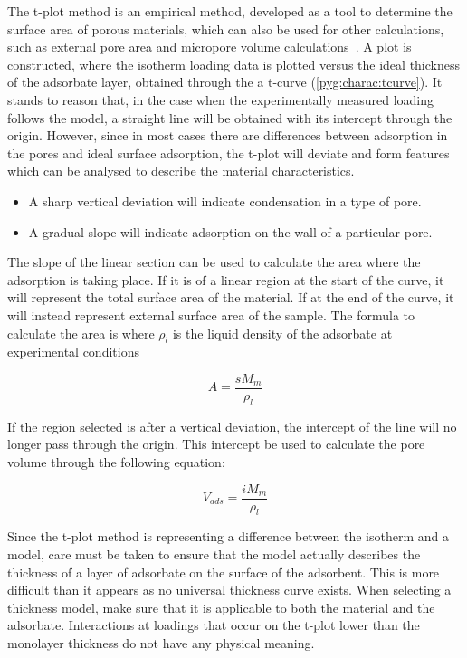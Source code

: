 The t-plot method is an empirical method, developed as a
tool to determine the surface area of porous materials,
which can also be used for other calculations, such as 
external pore area and micropore volume 
calculations~\cite{lippensStudiesPoreSystems1965}.
A plot is constructed, where the isotherm loading
data is plotted versus the ideal thickness of the adsorbate layer,
obtained through the a t-curve (\ref{pyg:charac:tcurve}).
It stands to reason that, in the case when the experimentally measured
loading follows the model, a straight line will be obtained with its
intercept through the origin. However, since in most cases there
are differences between adsorption in the pores and ideal surface
adsorption, the t-plot will deviate and form features which can
be analysed to describe the material characteristics.

\begin{itemize}

	\item A sharp vertical deviation will indicate condensation
	      in a type of pore.
	\item A gradual slope will indicate adsorption on the
		  wall of a particular pore.

\end{itemize}

The slope of the linear section can be used to calculate the area where
the adsorption is taking place. If it is of a linear region at the start
of the curve, it will represent the total surface area of the material.
If at the end of the curve, it will instead represent external surface
area of the sample. The formula to calculate the area is
where \(\rho_{l}\) is the liquid density of the adsorbate at experimental
conditions

\begin{equation}
	A = \frac{s M_m}{\rho_{l}}
\end{equation}

If the region selected is after a vertical deviation, the intercept of the line
will no longer pass through the origin. This intercept be used to calculate the
pore volume through the following equation:

\begin{equation}
	V_{ads} = \frac{i M_m}{\rho_{l}}
\end{equation}

Since the t-plot method is representing a difference between the
isotherm and a model, care must be taken to ensure that the model
actually describes the thickness of a layer of adsorbate on the
surface of the adsorbent. This is more difficult than it
appears as no universal thickness curve exists.
When selecting a thickness model, make sure that it is applicable
to both the material and the adsorbate.
Interactions at loadings that occur on the t-plot lower than the monolayer
thickness do not have any physical meaning.

